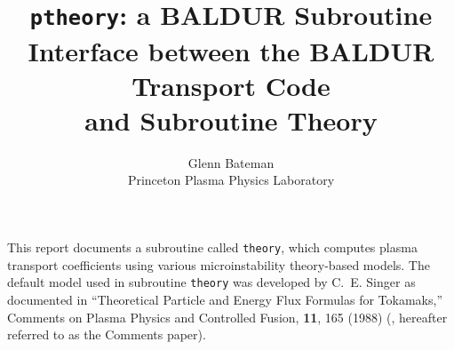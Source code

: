 %
%
\headheight 0pt \headsep 0pt  \topmargin 0pt  \oddsidemargin 0pt
\textheight 9.0in \textwidth 6.5in

\title{ {\tt ptheory}: a BALDUR Subroutine \\
 Interface between the BALDUR Transport Code \\
 and Subroutine Theory}	 %
\author{
        Glenn Bateman \\ Princeton Plasma Physics Laboratory}
\maketitle                 %

This report documents a subroutine called {\tt theory}, which computes plasma
transport coefficients using various microinstability theory-based models.
The default model used in subroutine {\tt theory} was developed by
C.~E. Singer as documented in
``Theoretical Particle and Energy Flux Formulas for Tokamaks,''
Comments on Plasma Physics and Controlled Fusion, {\bf 11}, 165 (1988)
(\cite{Comments}, hereafter referred to as the Comments paper).

